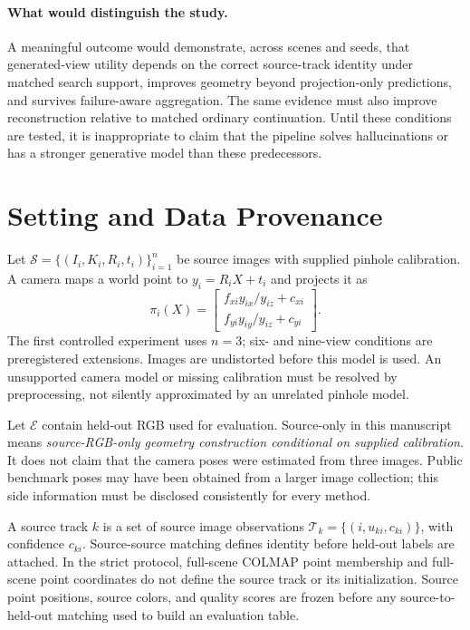 \documentclass[10pt,twocolumn,letterpaper]{article}
\newcommand{\cS}{\mathcal{S}}
\newcommand{\cE}{\mathcal{E}}
\newcommand{\cT}{\mathcal{T}}
\begin{document}
\paragraph{What would distinguish the study.} A meaningful outcome would demonstrate, across scenes and seeds, that generated-view utility depends on the correct source-track identity under matched search support, improves geometry beyond projection-only predictions, and survives failure-aware aggregation. The same evidence must also improve reconstruction relative to matched ordinary continuation. Until these conditions are tested, it is inappropriate to claim that the pipeline solves hallucinations or has a stronger generative model than these predecessors.

\section{Setting and Data Provenance}
Let $\cS=\{(I_i,K_i,R_i,t_i)\}_{i=1}^{n}$ be source images with supplied pinhole calibration. A camera maps a world point to $y_i=R_iX+t_i$ and projects it as
\begin{equation}
\pi_i(X)=\begin{bmatrix}f_{xi}y_{ix}/y_{iz}+c_{xi}\\f_{yi}y_{iy}/y_{iz}+c_{yi}\end{bmatrix}.
\end{equation}
The first controlled experiment uses $n=3$; six- and nine-view conditions are preregistered extensions. Images are undistorted before this model is used. An unsupported camera model or missing calibration must be resolved by preprocessing, not silently approximated by an unrelated pinhole model.

Let $\cE$ contain held-out RGB used for evaluation. Source-only in this manuscript means \emph{source-RGB-only geometry construction conditional on supplied calibration}. It does not claim that the camera poses were estimated from three images. Public benchmark poses may have been obtained from a larger image collection; this side information must be disclosed consistently for every method.

A source track $k$ is a set of source image observations $\cT_k=\{(i,u_{ki},c_{ki})\}$, with confidence $c_{ki}$. Source-source matching defines identity before held-out labels are attached. In the strict protocol, full-scene COLMAP point membership and full-scene point coordinates do not define the source track or its initialization. Source point positions, source colors, and quality scores are frozen before any source-to-held-out matching used to build an evaluation table.
\end{document}
